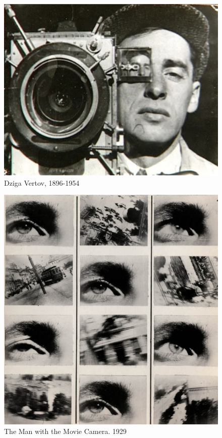 \documentclass[
  french,
]{book}
\begin{document}
\begin{figure}
\centering
\includegraphics{medias/corpus/vertov/Dziga-Vertov.jpg}
\caption{Dziga Vertov, 1896-1954}
\end{figure}

\begin{figure}
\centering
\includegraphics{medias/corpus/vertov/ManWAMovieCamera_1929_DzigaVertov.jpg}
\caption{The Man with the Movie Camera. 1929}
\end{figure}
\end{document}
